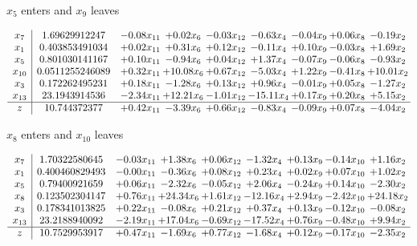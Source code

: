 \documentclass[9pt]{article}
\begin{document}
 $ x_{5} $ enters and $ x_{9} $ leaves 

 \[\begin{array}{c| c c@{\hskip 2pt} c@{\hskip 2pt} c@{\hskip 2pt} c@{\hskip 2pt} c@{\hskip 2pt} c@{\hskip 2pt} c@{\hskip 2pt} }
 x_{7}   &  1.69629912247 & -0.08 x_{11} & +  0.02 x_{6} & -0.03 x_{12} & -0.63 x_{4} & -0.04 x_{9} & +  0.06 x_{8} & -0.19 x_{2}\\
 x_{1}   &  0.403853491034 & +  0.02 x_{11} & +  0.31 x_{6} & +  0.12 x_{12} & -0.11 x_{4} & +  0.10 x_{9} & -0.03 x_{8} & +  1.69 x_{2}\\
 x_{5}   &  0.801030141167 & +  0.10 x_{11} & -0.94 x_{6} & +  0.04 x_{12} & +  1.37 x_{4} & -0.07 x_{9} & -0.06 x_{8} & -0.93 x_{2}\\
 x_{10}   &  0.0511255246089 & +  0.32 x_{11} & + 10.08 x_{6} & +  0.67 x_{12} & -5.03 x_{4} & +  1.22 x_{9} & -0.41 x_{8} & + 10.01 x_{2}\\
 x_{3}   &  0.172262495231 & +  0.18 x_{11} & -1.28 x_{6} & +  0.13 x_{12} & +  0.96 x_{4} & -0.01 x_{9} & +  0.05 x_{8} & -1.27 x_{2}\\
 x_{13}   &  23.1943914536 & -2.34 x_{11} & + 12.21 x_{6} & -1.01 x_{12} & -15.11 x_{4} & +  0.17 x_{9} & +  0.20 x_{8} & +  5.15 x_{2}\\
\hline
z    &  10.744372377 & +  0.42 x_{11} & -3.39 x_{6} & +  0.66 x_{12} & -0.83 x_{4} & -0.09 x_{9} & +  0.07 x_{8} & -4.04 x_{2}\\
\end{array}\]


 $ x_{8} $ enters and $ x_{10} $ leaves 

 \[\begin{array}{c| c c@{\hskip 2pt} c@{\hskip 2pt} c@{\hskip 2pt} c@{\hskip 2pt} c@{\hskip 2pt} c@{\hskip 2pt} c@{\hskip 2pt} }
 x_{7}   &  1.70322580645 & -0.03 x_{11} & +  1.38 x_{6} & +  0.06 x_{12} & -1.32 x_{4} & +  0.13 x_{9} & -0.14 x_{10} & +  1.16 x_{2}\\
 x_{1}   &  0.400460829493 & -0.00 x_{11} & -0.36 x_{6} & +  0.08 x_{12} & +  0.23 x_{4} & +  0.02 x_{9} & +  0.07 x_{10} & +  1.02 x_{2}\\
 x_{5}   &  0.79400921659 & +  0.06 x_{11} & -2.32 x_{6} & -0.05 x_{12} & +  2.06 x_{4} & -0.24 x_{9} & +  0.14 x_{10} & -2.30 x_{2}\\
 x_{8}   &  0.123502304147 & +  0.76 x_{11} & + 24.34 x_{6} & +  1.61 x_{12} & -12.16 x_{4} & +  2.94 x_{9} & -2.42 x_{10} & + 24.18 x_{2}\\
 x_{3}   &  0.178341013825 & +  0.22 x_{11} & -0.08 x_{6} & +  0.21 x_{12} & +  0.37 x_{4} & +  0.13 x_{9} & -0.12 x_{10} & -0.08 x_{2}\\
 x_{13}   &  23.2188940092 & -2.19 x_{11} & + 17.04 x_{6} & -0.69 x_{12} & -17.52 x_{4} & +  0.76 x_{9} & -0.48 x_{10} & +  9.94 x_{2}\\
\hline
z    &  10.7529953917 & +  0.47 x_{11} & -1.69 x_{6} & +  0.77 x_{12} & -1.68 x_{4} & +  0.12 x_{9} & -0.17 x_{10} & -2.35 x_{2}\\
\end{array}\]
\end{document}
